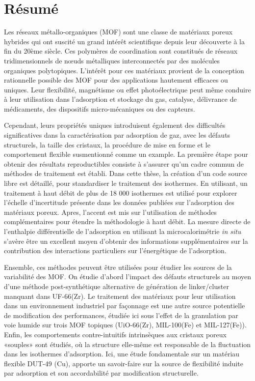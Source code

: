 \pagebreak

\chapter{Résumé}

Les réseaux métallo-organiques (MOF) sont une classe de matériaux poreux
hybrides qui ont suscité un grand intérêt scientifique depuis leur 
découverte à la fin du 20ème siècle. Ces polymères de coordination sont 
constitués de réseaux tridimensionnels de nœuds métalliques interconnectés 
par des molécules organiques polytopiques. L'intérêt pour ces matériaux 
provient de la conception rationnelle possible des MOF pour des 
applications hautement efficaces ou uniques.
Leur flexibilité, magnétisme ou effet photoélectrique
peut même conduire à leur utilisation dans l'adsorption et stockage du
gas, catalyse, délivrance de médicaments, des dispositifs micro-mécaniques
ou des capteurs.

Cependant, leurs propriétés uniques introduisent également des difficultés
significatives dans la caractérisation par adsorption de gaz, avec les 
défauts structurels, la taille des cristaux, la procédure de mise en forme et le 
comportement flexible susmentionné comme un example. 
La première étape pour obtenir des résultats reproductibles consiste à s'assurer
qu'un cadre commun de méthodes de traitement 
est établi. Dans cette thèse, la création d'un code source libre est détaillé, 
pour standardiser le traitement des isothermes. En utilisant, un traitement à 
haut débit de plus de 18 000 isothermes est 
utilisé pour explorer l'échelle d'incertitude présente dans les données publiées 
sur l'adsorption des matériaux poreux.
Apres, l'accent est mis sur l'utilisation de méthodes complémentaires pour étendre la 
méthodologie à haut débit. La mesure directe de l'enthalpie différentielle de
l'adsorption en utilisant la microcalorimétrie \textit{in situ} s'avère être
un excellent moyen d'obtenir des informations supplémentaires sur la contribution
des interactions particuliers sur l'énergétique de l'adsorption.

Ensemble, ces méthodes peuvent être utilisées pour étudier les sources 
de la variabilité des MOF. On étudie d’abord l’impact des défauts
structurels au moyen d’une méthode post-synthétique alternative de
génération de linker/cluster manquant dans UF-66(Zr). 
Le traitement des matériaux pour leur utilisation dans 
un environnement industriel par façonnage est une autre source potentielle de 
modification des performances, étudiée ici sous l’effet de la granulation par 
voie humide sur trois MOF topiques (UiO-66(Zr), MIL-100(Fe) et MIL-127(Fe)). 
Enfin, les comportements contre-intuitifs intrinsèques aux cristaux poreux 
«souples» sont étudiés, où la structure elle-même est responsable de la 
fluctuation dans les isothermes d'adsorption. Ici, une étude fondamentale sur un 
matériau flexible DUT-49 (Cu), apporte un savoir-faire sur la source de
flexibilité induite par adsorption et son accordabilité par modification structurelle.
